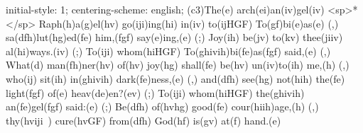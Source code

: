 initial-style: 1;
centering-scheme: english;
(c3)The(e) arch(ei)an(iv)gel(iv) <sp>*</sp> Raph(h)a(g)el(hv) go(iji)ing(hi) in(iv) to(ijHGF) To(gf)bi(e)as(e) (,) sa(dfh)lut(hg)ed(fe) him,(fgf) say(e)ing,(e) (;) Joy(ih) be(jv) to(kv) thee(jiiv) al(hi)ways.(iv) (;) To(iji) whom(hiHGF) To(ghivih)bi(fe)as(fgf) said,(e) (,) What(d) man(fh)ner(hv) of(hv) joy(hg) shall(fe) be(hv) un(iv)to(ih) me,(h) (,) who(ij) sit(ih) in(ghivih) dark(fe)ness,(e) (,) and(dfh) see(hg) not(hih) the(fe) light(fgf) of(e) heav(de)en?(ev) (;) To(iji) whom(hiHGF) the(ghivih) an(fe)gel(fgf) said:(e) (;) Be(dfh) of(hvhg) good(fe) cour(hiih)age,(h) (,) thy(hviji~) cure(hvGF) from(dfh) God(hf) is(gv) at(f) hand.(e)
